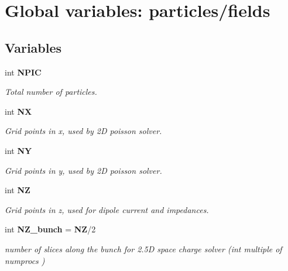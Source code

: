 \section{Global variables: particles/fields}
\label{group__Particles}
\subsection*{Variables}
\begin{CompactItemize}
\item 
int {\bf NPIC}\label{group__Particles_a0}

\begin{CompactList}\small\item\em Total number of particles.\item\end{CompactList}\item 
int {\bf NX}\label{group__Particles_a1}

\begin{CompactList}\small\item\em Grid points in x, used by 2D poisson solver.\item\end{CompactList}\item 
int {\bf NY}\label{group__Particles_a2}

\begin{CompactList}\small\item\em Grid points in y, used by 2D poisson solver.\item\end{CompactList}\item 
int {\bf NZ}\label{group__Particles_a3}

\begin{CompactList}\small\item\em Grid points in z, used for dipole current and impedances.\item\end{CompactList}\item 
int {\bf NZ\_\-bunch} = {\bf NZ}/2\label{group__Particles_a4}

\begin{CompactList}\small\item\em number of slices along the bunch for 2.5D space charge solver (int multiple of numprocs )\item\end{CompactList}\end{CompactItemize}
